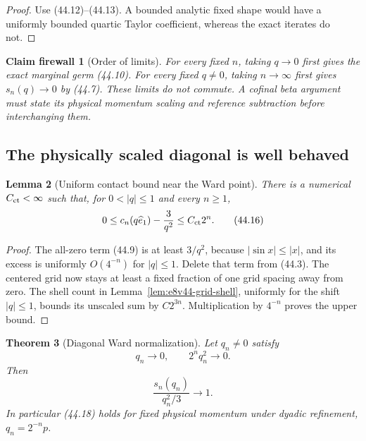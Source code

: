 \documentclass[11pt,oneside]{book}
\newtheorem{theorem}{Theorem}[chapter]
\newtheorem{lemma}[theorem]{Lemma}
\newtheorem{firewall}[theorem]{Claim firewall}
\theoremstyle{definition}
\theoremstyle{remark}
\begin{document}
\begin{proof}
Use (44.12)--(44.13).  A bounded analytic fixed shape would have a
uniformly bounded quartic Taylor coefficient, whereas the exact
iterates do not.
\end{proof}

\begin{firewall}[Order of limits]
\label{fire:e8v44-order-limits}
For every fixed \(n\), taking \(q\to0\) first gives the exact
marginal germ (44.10).  For every fixed \(q\ne0\), taking
\(n\to\infty\) first gives \(s_n(q)\to0\) by (44.7).  These limits
do not commute.  A cofinal beta argument must state its physical
momentum scaling and reference subtraction before interchanging
them.
\end{firewall}

\subsection{The physically scaled diagonal is well behaved}

\begin{lemma}[Uniform contact bound near the Ward point]
\label{lem:e8v44-contact-bound}
There is a numerical \(C_{\rm ct}<\infty\) such that, for
\(0<|q|\le1\) and every \(n\ge1\),
\[
 0\le
 c_n(q\widehat e_1)-\frac3{q^2}
 \le C_{\rm ct}2^n.                                             \tag{44.16}
\]
\end{lemma}

\begin{proof}
The all-zero term (44.9) is at least \(3/q^2\), because
\(|\sin x|\le|x|\), and its excess is uniformly \(O(4^{-n})\)
for \(|q|\le1\).  Delete that term from (44.3).  The centered grid
now stays at least a fixed fraction of one grid spacing away from
zero.  The shell count in
Lemma~\ref{lem:e8v44-grid-shell}, uniformly for the shift
\(|q|\le1\), bounds its unscaled sum by \(C2^{3n}\).
Multiplication by \(4^{-n}\) proves the upper bound.
\end{proof}

\begin{theorem}[Diagonal Ward normalization]
\label{thm:e8v44-diagonal-Ward}
Let \(q_n\ne0\) satisfy
\[
 q_n\longrightarrow0,\qquad 2^nq_n^2\longrightarrow0.          \tag{44.17}
\]
Then
\[
 \boxed{
 \frac{s_n(q_n)}{q_n^2/3}\longrightarrow1.}                    \tag{44.18}
\]
In particular (44.18) holds for fixed physical momentum under
dyadic refinement, \(q_n=2^{-n}p\).
\end{theorem}
\end{document}
